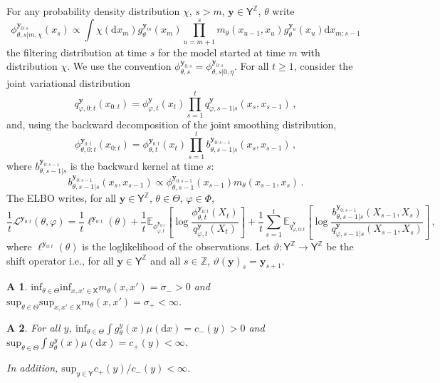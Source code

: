 \documentclass{article}
\newcommand{\1}{\mathbbm{1}}
\newcommand{\Xset}{\mathsf{X}}
\def\Yset{\mathsf{Y}}
\newtheorem{assumptionA}{\textbf{A}\hspace{-3pt}}
\newcommand{\rmd}{\ensuremath{\mathrm{d}}}
\newcommand{\shift}{\vartheta}
\newcommand{\bfy}{\mathbf{y}}
\newcommand{\Zset}{\mathbb{Z}}
\begin{document}
For any probability density distribution $\chi$, $s>m$, $\bfy\in\Yset^{\Zset}$, $\theta$ write
$$
\phi^{\bfy_{0:s}}_{\theta,s|m,\chi}(x_{s}) \propto \int \chi(\rmd x_m)g_\theta^{\bfy_m}(x_m)\prod_{u=m+1}^s m_\theta(x_{u-1},x_u)g_\theta^{\bfy_u}(x_u)\rmd x_{m:s-1}
$$
the filtering distribution at time $s$ for the model started at time $m$ with distribution $\chi$. We use the convention $\phi^{\bfy_{0:s}}_{\theta,s} = \phi^{\bfy_{0:s}}_{\theta,s|0,\eta}$.
For all $t\geq 1$, consider the joint variational distribution
$$
q^{\bfy}_{\varphi,0:t}(x_{0:t}) = \phi^{\bfy}_{\varphi,t}(x_t)\prod_{s=1}^tq^{\bfy}_{\varphi,s-1|s}(x_s,x_{s-1})\,,
$$
and, using the backward decomposition of the joint smoothing distribution,
$$
\phi^{\bfy_{0:t}}_{\theta,0:t}(x_{0:t}) = \phi^{\bfy_{0:t}}_{\theta,t}(x_t)\prod_{s=1}^tb^{\bfy_{0:s-1}}_{\theta,s-1|s}(x_s,x_{s-1})\,,
$$
where $b^{\bfy_{0:s-1}}_{\theta,s-1|s}$ is the backward kernel at time $s$:
\begin{equation}
\label{eq:backwardk}
b^{\bfy_{0:s-1}}_{\theta,s-1|s}(x_s,x_{s-1}) \propto \phi^{\bfy_{0:s-1}}_{\theta,s-1}(x_{s-1})m_\theta(x_{s-1},x_s)\,.
\end{equation}
The ELBO writes, for all $\bfy\in\Yset^{\Zset}$, $\theta\in\Theta$, $\varphi\in\Phi$,
$$
\frac{1}{t}\mathcal{L}^{\bfy_{0:t}}(\theta,\varphi)= \frac{1}{t}\ell^{\bfy_{0:t}}(\theta) +  \frac{1}{t}\mathbb{E}_{\phi^{\bfy_{0:t}}_{\varphi,t}}\left[\log \frac{\phi^{\bfy_{0:t}}_{\theta,t}(X_{t})}{q^{\bfy}_{\varphi,t}(X_{t})}\right] + \frac{1}{t}\sum_{s=1}^t\mathbb{E}_{q^{\bfy}_{\varphi,0:t}}\left[\log \frac{b^{\bfy_{0:s-1}}_{\theta,s-1|s}(X_{s-1},X_s)}{q^{\bfy}_{\varphi,s-1|s}(X_{s-1},X_s)}\right]\,,
$$
where $\ell^{\bfy_{0:t}}(\theta)$ is the loglikelihood of the observations. Let $\shift: \Yset^\Zset\to \Yset^\Zset$ be the shift operator i.e., for all $\bfy\in\Yset^\Zset$ and all $s\in\Zset$, $\shift(\bfy)_s = \bfy_{s+1}$.
\begin{assumptionA}
\label{assum:transition:hmm}
$\mathrm{inf}_{\theta\in\Theta}\mathrm{inf}_{x,x'\in\Xset} m_\theta(x,x') = \sigma_->0$ and $\mathrm{sup}_{\theta\in\Theta}\mathrm{sup}_{x,x'\in\Xset} m_\theta(x,x') = \sigma_+<\infty$. 
\end{assumptionA}

\begin{assumptionA}
\label{assum:bound:likelihood}
For all $y$, $\mathrm{inf}_{\theta\in\Theta}\int g_\theta^y(x)\mu(\rmd x) = c_-(y)>0$ and $\mathrm{sup}_{\theta\in\Theta}\int g_\theta^y(x) \mu(\rmd x) = c_+(y)<\infty$. 

In addition, $\mathrm{sup}_{y\in\Yset} c_+(y)/c_-(y)<\infty$.
\end{assumptionA}
\end{document}

